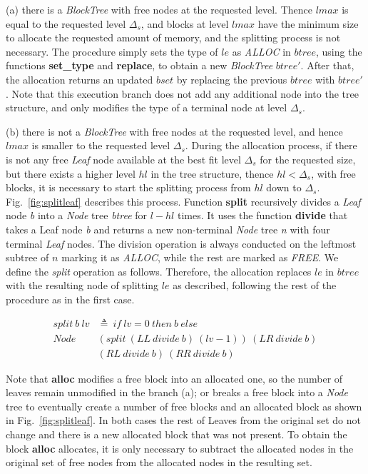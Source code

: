 (a) there is a \emph{BlockTree} with free nodes at the requested level. Thence $lmax$ is equal to the requested level $\Delta_s$, and blocks at level $lmax$ have the minimum size to allocate the requested amount of memory, and the splitting process is not necessary. The procedure simply sets the type of $le$ as \emph{ALLOC} in $btree$, using the functions \textbf{set\_type} and \textbf{replace}, to obtain a new \emph{BlockTree} $btree'$. After that, the allocation returns an updated $bset$ by replacing the previous $btree$ with $btree'$. Note that this execution branch does not add any additional node into the tree structure, and only modifies the type of a terminal node at level $\Delta_s$.

(b) there is not a \emph{BlockTree} with free nodes at the requested level, and hence $lmax$ is smaller to the requested level $\Delta_s$. During the allocation process, if there is not any free \emph{Leaf} node available at the best fit level $\Delta_s$ for the requested size, but there exists a higher level $hl$ in the tree structure, thence $hl < \Delta_s$, with free blocks, it is necessary to start the splitting process from $hl$ down to $\Delta_s$. Fig.~\ref{fig:splitleaf} describes this process. Function \textbf{split} recursively divides a \emph{Leaf} node \emph{b} into a \emph{Node} tree \emph{btree} for $l - hl$ times. It uses the function \textbf{divide} that takes a Leaf node \emph{b} and returns a new non-terminal \emph{Node} tree \emph{n} with four terminal \emph{Leaf} nodes. The division operation is always conducted on the leftmost subtree of $n$ marking it as \emph{ALLOC}, while the rest are marked as \emph{FREE}. We define the \emph{split} operation as follows. Therefore, the allocation replaces $le$ in $btree$ with the resulting node of splitting $le$ as described, following the rest of the procedure as in the first case.

\begin{definition} 
\begin{align*}
split\ b\ lv &\triangleq\ if\ lv = 0\ then\ b\ else\\
Node\ &(split\ (LL\ divide\ b)\ (lv - 1))\ (LR\ divide\ b)\\ 
&(RL\ divide\ b)\ (RR\ divide\ b)
\end{align*}
\end{definition}

Note that \textbf{alloc} modifies a free block into an allocated one, so the number of leaves remain unmodified in the branch (a); or breaks a free block into a \emph{Node} tree to eventually create a number of free blocks and an allocated block as shown in Fig.~\ref{fig:splitleaf}. In both cases the rest of Leaves from the original set do not change and there is a new allocated block that was not present. To obtain the block \textbf{alloc} allocates, it is only necessary to subtract the allocated nodes in the original set of free nodes from the allocated nodes in the resulting set.

